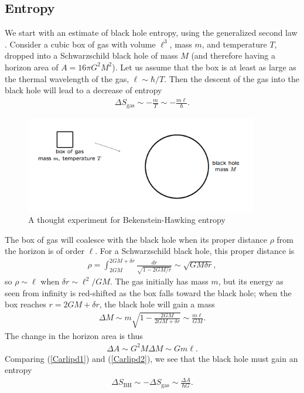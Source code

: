 \documentclass[11pt]{article}
\begin{document}
\subsection{Entropy \label{Enta}}
We start with an estimate of black hole entropy, using the generalized
second law \cite{Kiefer}.  Consider a cubic box of gas with volume
$\ell^3$, mass $m$, and temperature $T$, dropped into a Schwarzschild 
black hole of mass $M$ (and therefore having a horizon area of
$A = 16\pi G^2M^2$).  Let us assume that the box is at least as large 
as the thermal wavelength of the gas, $\ell\sim \hbar/T$.  Then the 
descent of the gas into the black hole will lead to a decrease of entropy
\begin{align}
\Delta S_{\mathrm{\scriptstyle gas}} \sim -\frac{m}{T} \sim -\frac{m\ell}{\hbar} .
\label{Carlipd1}
\end{align}
\begin{figure}
\centerline{\includegraphics[width=4in]{fig1b.pdf}}
\caption{A thought experiment for Bekenstein-Hawking entropy}
\label{Carlipfig1}
\end{figure}

The box of gas will coalesce with the black hole when its proper
distance $\rho$ from the horizon is of order $\ell$.  For a Schwarzschild 
black hole, this proper distance is
\begin{align*}
\rho = \int_{2GM}^{2GM + \delta r} \frac{dr}{\sqrt{1- 2GM/r}}
 \sim \sqrt{GM\delta r}  ,
\end{align*}
so $\rho \sim \ell$ when $\delta r \sim \ell^2/GM$.  The gas initially 
has mass $m$, but its energy as seen from infinity is red-shifted 
as the box falls toward the black hole; when the box reaches 
$r = 2GM + \delta r$, the black hole will gain a mass 
\begin{align*}
\Delta M \sim m \sqrt{1 - \frac{2GM}{2GM + \delta r}} 
 \sim \frac{m\ell}{GM}  .
\end{align*}
The change in the horizon area is thus
\begin{align}
\Delta A \sim G^2M\Delta M \sim Gm\ell  .
\label{Carlipd2}
\end{align}
Comparing (\ref{Carlipd1}) and (\ref{Carlipd2}), we see that the black hole
must gain an entropy
\begin{align}
\Delta S_{\scriptscriptstyle\mathrm{BH}} \sim -\Delta S_{\mathrm{\scriptstyle gas}}
\sim \frac{\Delta A}{\hbar G}   .
\label{Carlipd3}
\end{align}
\end{document}
